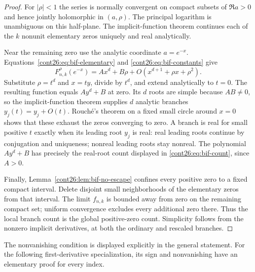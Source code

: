 \documentclass[11pt,letterpaper]{article}
\numberwithin{equation}{section}
\theoremstyle{plain}
\theoremstyle{definition}
\theoremstyle{remark}
\begin{document}
\begin{proof}
For $|\rho|<1$ the series is normally convergent on compact subsets
of $\Re a>0$ and hence jointly holomorphic in $(a,\rho)$. The principal
logarithm is unambiguous on this half-plane. The implicit-function
theorem continues each of the $k$ nonunit elementary zeros uniquely
and real analytically.

Near the remaining zero use the analytic coordinate $a=e^{-x}$.
Equations~\eqref{cont26:eq:bif-elementary} and \eqref{cont26:eq:bif-constants} give
\begin{equation}\label{cont26:eq:bif-local}
 F_{n,k}^{\rho}(e^{-x})
       =A x^d+B\rho+O(x^{d+1}+\rho x+\rho^2).
\end{equation}
Substitute $\rho=t^d$ and $x=ty$, divide by $t^d$, and extend
analytically to $t=0$. The resulting function equals $Ay^d+B$ at zero.
Its $d$ roots are simple because $AB\ne0$, so the implicit-function
theorem supplies $d$ analytic branches $y_j(t)=y_j+O(t)$. Rouch\'e's
theorem on a fixed small circle around $x=0$ shows that these exhaust
the zeros converging to zero. A branch is real for small positive $t$
exactly when its leading root $y_j$ is real: real leading roots continue
by conjugation and uniqueness; nonreal leading roots stay nonreal.
The polynomial $Ay^d+B$ has precisely the real-root count displayed
in \eqref{cont26:eq:bif-count}, since $A>0$.

Finally, Lemma~\ref{cont26:lem:bif-no-escape} confines every positive zero to
a fixed compact interval. Delete disjoint small neighborhoods of the
elementary zeros from that interval. The limit $f_{n,k}$ is bounded
away from zero on the remaining compact set; uniform convergence
excludes every additional zero there. Thus the local branch count is
the global positive-zero count. Simplicity follows from the nonzero
implicit derivatives, at both the ordinary and rescaled branches.
\end{proof}

The nonvanishing condition is displayed explicitly in the general
statement. For the following first-derivative specialization, its sign
and nonvanishing have an elementary proof for every index.
\end{document}
